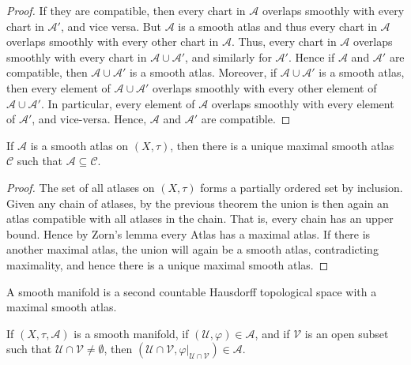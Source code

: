 \documentclass{article}                                                        %
\begin{document}
        \begin{proof}
            If they are compatible, then every chart in $\mathcal{A}$ overlaps
            smoothly with every chart in $\mathcal{A}'$, and vice versa. But
            $\mathcal{A}$ is a smooth atlas and thus every chart in
            $\mathcal{A}$ overlaps smoothly with every other chart in
            $\mathcal{A}$. Thus, every chart in $\mathcal{A}$ overlaps smoothly
            with every chart in $\mathcal{A}\cup\mathcal{A}'$, and similarly for
            $\mathcal{A}'$. Hence if $\mathcal{A}$ and $\mathcal{A}'$ are
            compatible, then $\mathcal{A}\cup\mathcal{A}'$ is a smooth atlas.
            Moreover, if $\mathcal{A}\cup\mathcal{A}'$ is a smooth atlas, then
            every element of $\mathcal{A}\cup\mathcal{A}'$ overlaps smoothly
            with every other element of $\mathcal{A}\cup\mathcal{A}'$. In
            particular, every element of $\mathcal{A}$ overlaps smoothly with
            every element of $\mathcal{A}'$, and vice-versa. Hence,
            $\mathcal{A}$ and $\mathcal{A}'$ are compatible.
        \end{proof}
        \begin{theorem}
            If $\mathcal{A}$ is a smooth atlas on $(X,\tau)$, then there is a
            unique maximal smooth atlas $\mathcal{C}$ such that
            $\mathcal{A}\subseteq\mathcal{C}$.
        \end{theorem}
        \begin{proof}
            The set of all atlases on $(X,\tau)$ forms a partially ordered set
            by inclusion. Given any chain of atlases, by the previous theorem
            the union is then again an atlas compatible with all atlases in the
            chain. That is, every chain has an upper bound. Hence by Zorn's
            lemma every Atlas has a maximal atlas. If there is another maximal
            atlas, the union will again be a smooth atlas, contradicting
            maximality, and hence there is a unique maximal smooth atlas.
        \end{proof}
        A smooth manifold is a second countable Hausdorff topological space with
        a maximal smooth atlas.
        \begin{theorem}
            If $(X,\tau,\mathcal{A})$ is a smooth manifold, if
            $(\mathcal{U},\varphi)\in\mathcal{A}$, and if $\mathcal{V}$ is an
            open subset such that $\mathcal{U}\cap\mathcal{V}\ne\emptyset$, then
            $(\mathcal{U}\cap\mathcal{V},%
             \varphi|_{\mathcal{U}\cap\mathcal{V}})\in\mathcal{A}$.
        \end{theorem}
\end{document}
